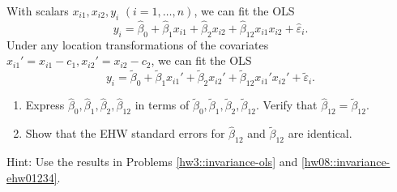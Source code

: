 With scalars $x_{i1}, x_{i2}, y_i$ $(i=1,\ldots, n)$, we can fit the OLS
$$
y_i = \hat{\beta}_0  + \hat{\beta}_1 x_{i1}  +  \hat{\beta}_2 x_{i2} + \hat{\beta}_{12} x_{i1}  x_{i2}  + \hat{\varepsilon}_i.
$$
Under any location transformations of the covariates $  x_{i1}' =x_{i1}  -c_1 , x_{i2} ' = x_{i2} - c_2$, we can fit the OLS
$$
y_i = \tilde{\beta}_0  + \tilde{\beta}_1 x_{i1}'  +  \tilde{\beta}_2 x_{i2}' + \tilde{\beta}_{12} x_{i1} ' x_{i2}'  + \tilde{\varepsilon}_i.
$$

\begin{enumerate}
\item
Express $\hat{\beta}_0, \hat{\beta}_1, \hat{\beta}_2, \hat{\beta}_{12}$ in terms of $\tilde{\beta}_0 , \tilde{\beta}_1, \tilde{\beta}_2, \tilde{\beta}_{12}$. Verify that $\hat{\beta}_{12} = \tilde{\beta}_{12} .$

\item
Show that the EHW standard errors for $\hat{\beta}_{12}$ and $\tilde{\beta}_{12} $ are identical.
\end{enumerate}

 Hint: Use the results in Problems \ref{hw3::invariance-ols} and \ref{hw08::invariance-ehw01234}. 
 
 
 
 
